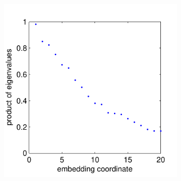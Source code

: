 \begin{figure}
\begin{subfigure}{0.22\textwidth}
\caption{}
\end{subfigure}
\begin{subfigure}{0.22\textwidth}
\includegraphics[width=\textwidth]{figS6}
\caption{}
\end{subfigure}

\end{figure}
